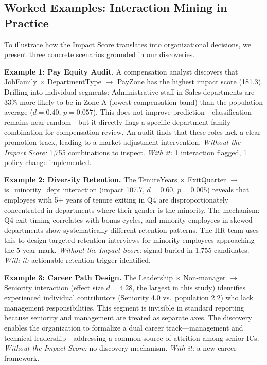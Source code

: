 \documentclass[conference]{IEEEtran}
\begin{document}
\subsection{Worked Examples: Interaction Mining in Practice}

To illustrate how the Impact Score translates into organizational decisions, we present three concrete scenarios grounded in our discoveries.

\textbf{Example 1: Pay Equity Audit.} A compensation analyst discovers that JobFamily $\times$ DepartmentType $\to$ PayZone has the highest impact score (181.3). Drilling into individual segments: Administrative staff in Sales departments are 33\% more likely to be in Zone A (lowest compensation band) than the population average ($d = 0.40$, $p = 0.057$). This does not improve prediction---classification remains near-random---but it directly flags a specific department-family combination for compensation review. An audit finds that these roles lack a clear promotion track, leading to a market-adjustment intervention. \textit{Without the Impact Score:} 1,755 combinations to inspect. \textit{With it:} 1 interaction flagged, 1 policy change implemented.

\textbf{Example 2: Diversity Retention.} The TenureYears $\times$ ExitQuarter $\to$ is\_minority\_dept interaction (impact 107.7, $d = 0.60$, $p = 0.005$) reveals that employees with 5+ years of tenure exiting in Q4 are disproportionately concentrated in departments where their gender is the minority. The mechanism: Q4 exit timing correlates with bonus cycles, and minority employees in skewed departments show systematically different retention patterns. The HR team uses this to design targeted retention interviews for minority employees approaching the 5-year mark. \textit{Without the Impact Score:} signal buried in 1,755 candidates. \textit{With it:} actionable retention trigger identified.

\textbf{Example 3: Career Path Design.} The Leadership $\times$ Non-manager $\to$ Seniority interaction (effect size $d = 4.28$, the largest in this study) identifies experienced individual contributors (Seniority 4.0 vs.\ population 2.2) who lack management responsibilities. This segment is invisible in standard reporting because seniority and management are treated as separate axes. The discovery enables the organization to formalize a dual career track---management and technical leadership---addressing a common source of attrition among senior ICs. \textit{Without the Impact Score:} no discovery mechanism. \textit{With it:} a new career framework.
\end{document}
